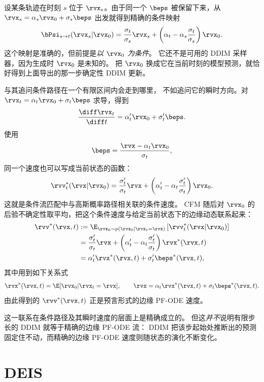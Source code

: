 设某条轨迹在时刻 $s$ 位于 $\rvx_s$。由于同一个
$\beps$ 被保留下来，从 $\rvx_s=\alpha_s\rvx_0+\sigma_s\beps$
出发就得到精确的条件映射
\[
\bPsi_{s\to t}(\rvx_s|\rvx_0)
=
\frac{\sigma_t}{\sigma_s}\rvx_s
+
\left(
\alpha_t
-
\alpha_s\frac{\sigma_t}{\sigma_s}
\right)\rvx_0.
\]
这个映射是准确的，但前提是\emph{以 $\rvx_0$ 为条件}。
它还不是可用的 DDIM 采样器，因为生成时 $\rvx_0$ 是未知的。
把 $\rvx_0$ 换成它在当前时刻的模型预测，就恰好得到上面导出的那一步确定性 DDIM 更新。

与其追问条件路径在一个有限区间内会走到哪里，
不如追问它的瞬时方向。对
$\rvx_t=\alpha_t\rvx_0+\sigma_t\beps$ 求导，得到
\[
\frac{\diff\rvx_t}{\diff t}
=
\alpha_t'\rvx_0+\sigma_t'\beps.
\]
使用
\[
\beps
=
\frac{\rvx-\alpha_t\rvx_0}{\sigma_t},
\]
同一个速度也可以写成当前状态的函数：
\[
\rvv_t^*(\rvx|\rvx_0)
=
\frac{\sigma_t'}{\sigma_t}\rvx
+
\left(
\alpha_t'
-
\alpha_t\frac{\sigma_t'}{\sigma_t}
\right)\rvx_0.
\]
这就是条件流匹配中与高斯概率路径相关联的条件速度。
CFM 随后对 $\rvx_0$ 的后验不确定性取平均，把这个条件速度与给定当前状态下的边缘动态联系起来：
\begin{align*}
\rvv^*(\rvx,t)
&:=
\E_{\rvx_0\sim p(\rvx_0|\rvx_t=\rvx)}
\left[
\rvv_t^*(\rvx|\rvx_0)
\right]
\\
&=
\frac{\sigma_t'}{\sigma_t}\rvx
+
\left(
\alpha_t'
-
\alpha_t\frac{\sigma_t'}{\sigma_t}
\right)
\rvx^*(\rvx,t)
\\
&=
\alpha_t'\rvx^*(\rvx,t)
+
\sigma_t'\beps^*(\rvx,t),
\end{align*}
其中用到如下关系式
\[
\rvx^*(\rvx,t)
=
\E[\rvx_0|\rvx_t=\rvx],
\qquad
\rvx
=
\alpha_t\rvx^*(\rvx,t)
+
\sigma_t\beps^*(\rvx,t).
\]
由此得到的 $\rvv^*(\rvx,t)$ 正是预言形式的边缘 PF-ODE 速度。


这一联系在条件路径及其瞬时速度的层面上是精确成立的。
但这\emph{并不}说明有限步长的 DDIM 就等于精确的边缘 PF-ODE 流：
DDIM 把该步起始处推断出的预测固定住不动，而精确的边缘 PF-ODE 速度则随状态的演化不断变化。


\section{\texorpdfstring{DEIS}{DEIS}}\label{sec:exponential}

